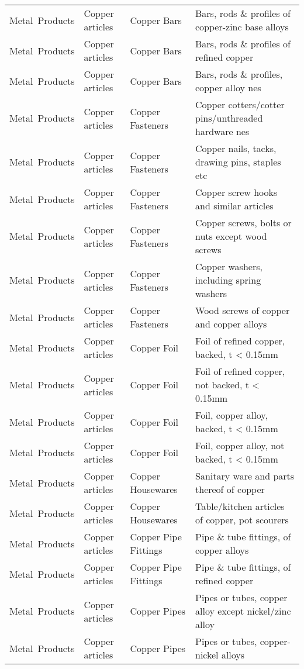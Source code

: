 \begin{appendices}
\begin{xltabular}{\textwidth}{|p{0.10\textwidth}|p{0.25\textwidth}|p{0.20\textwidth}|p{0.35\textwidth}|}
		Metal\ Products & Copper articles & Copper Bars & Bars, rods \& profiles of copper-zinc base alloys \\
		Metal\ Products & Copper articles & Copper Bars & Bars, rods \& profiles of refined copper \\
		Metal\ Products & Copper articles & Copper Bars & Bars, rods \& profiles, copper alloy nes \\
		Metal\ Products & Copper articles & Copper Fasteners & Copper cotters/cotter pins/unthreaded hardware nes \\
		Metal\ Products & Copper articles & Copper Fasteners & Copper nails, tacks, drawing pins, staples etc \\
		Metal\ Products & Copper articles & Copper Fasteners & Copper screw hooks and similar articles \\
		Metal\ Products & Copper articles & Copper Fasteners & Copper screws, bolts or nuts except wood screws \\
		Metal\ Products & Copper articles & Copper Fasteners & Copper washers, including spring washers \\
		Metal\ Products & Copper articles & Copper Fasteners & Wood screws of copper and copper alloys \\
		Metal\ Products & Copper articles & Copper Foil & Foil of refined copper, backed, t < 0.15mm \\
		Metal\ Products & Copper articles & Copper Foil & Foil of refined copper, not backed, t < 0.15mm \\
		Metal\ Products & Copper articles & Copper Foil & Foil, copper alloy, backed, t < 0.15mm \\
		Metal\ Products & Copper articles & Copper Foil & Foil, copper alloy, not backed, t < 0.15mm \\
		Metal\ Products & Copper articles & Copper Housewares & Sanitary ware and parts thereof of copper \\
		Metal\ Products & Copper articles & Copper Housewares & Table/kitchen articles of copper, pot scourers \\
		Metal\ Products & Copper articles & Copper Pipe Fittings & Pipe \& tube fittings, of copper alloys \\
		Metal\ Products & Copper articles & Copper Pipe Fittings & Pipe \& tube fittings, of refined copper \\
		Metal\ Products & Copper articles & Copper Pipes & Pipes or tubes, copper alloy except nickel/zinc alloy \\
		Metal\ Products & Copper articles & Copper Pipes & Pipes or tubes, copper-nickel alloys \\

\end{xltabular}
\end{appendices}
